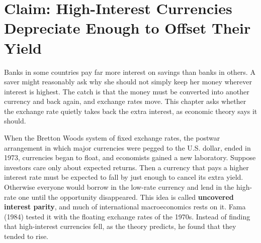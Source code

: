 \makeatletter
{}
\makeatother

\makeatletter
\makeatother

\chapter{Claim: High-Interest Currencies Depreciate Enough to Offset Their Yield}
\label{ch:06}

Banks in some countries pay far more interest on savings than banks in others. A saver might reasonably ask why she should not simply keep her money wherever interest is highest. The catch is that the money must be converted into another currency and back again, and exchange rates move. This chapter asks whether the exchange rate quietly takes back the extra interest, as economic theory says it should.

When the Bretton Woods system of fixed exchange rates, the postwar arrangement in which major currencies were pegged to the U.S. dollar, ended in 1973, currencies began to float, and economists gained a new laboratory. Suppose investors care only about expected returns. Then a currency that pays a higher interest rate must be expected to fall by just enough to cancel its extra yield. Otherwise everyone would borrow in the low-rate currency and lend in the high-rate one until the opportunity disappeared. This idea is called \textbf{uncovered interest parity}, and much of international macroeconomics rests on it. Fama (1984) tested it with the floating exchange rates of the 1970s. Instead of finding that high-interest currencies fell, as the theory predicts, he found that they tended to rise.

